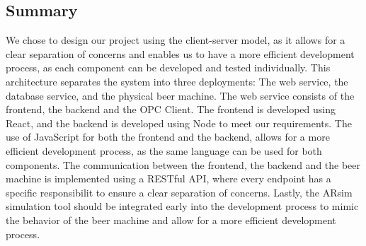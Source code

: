 \subsection{Summary}
We chose to design our project using the client-server model, as it allows for a clear separation of concerns and enables us to have a more efficient development process, as each component can be developed and tested individually. \newline
This architecture separates the system into three deployments: The web service, the database service, and the physical beer machine. \newline
The web service consists of the frontend, the backend and the OPC Client. The frontend is developed using React, and the backend is developed using Node to meet our requirements. The use of JavaScript for both the frontend and the backend, allows for a more efficient development process, as the same language can be used for both components. \newline
The communication between the frontend, the backend and the beer machine is implemented using a RESTful API, where every endpoint has a specific responsibilit to ensure a clear separation of concerns. \newline
Lastly, the ARsim simulation tool should be integrated early into the development process to mimic the behavior of the beer machine and allow for a more efficient development process. 